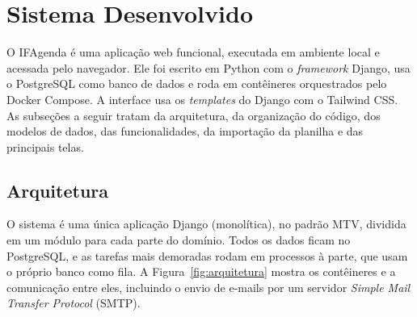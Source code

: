 \section{Sistema Desenvolvido}
\label{sec:resultado-sistema}

O IFAgenda é uma aplicação web funcional, executada em ambiente local e acessada pelo navegador. Ele foi escrito em Python com o \textit{framework} Django, usa o PostgreSQL como banco de dados e roda em contêineres orquestrados pelo Docker Compose. A interface usa os \textit{templates} do Django com o Tailwind CSS. As subseções a seguir tratam da arquitetura, da organização do código, dos modelos de dados, das funcionalidades, da importação da planilha e das principais telas.

\subsection{Arquitetura}
\label{sec:resultado-arquitetura}

O sistema é uma única aplicação Django (monolítica), no padrão MTV, dividida em um módulo para cada parte do domínio. Todos os dados ficam no PostgreSQL, e as tarefas mais demoradas rodam em processos à parte, que usam o próprio banco como fila. A Figura~\ref{fig:arquitetura} mostra os contêineres e a comunicação entre eles, incluindo o envio de e-mails por um servidor \textit{Simple Mail Transfer Protocol} (SMTP).

